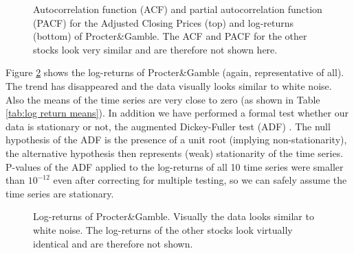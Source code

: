 \begin{figure}[h!]
    \centering
    \begin{adjustbox}{width=.95\textwidth,center}
    
    \end{adjustbox}  
    \hspace{3ex}
    \begin{adjustbox}{width=.95\textwidth,center}
    
    \end{adjustbox}
    \caption{Autocorrelation function (ACF) and partial autocorrelation function (PACF) for the Adjusted Closing Prices (top) and log-returns (bottom) of Procter\&Gamble. The ACF and PACF for the other stocks look very similar and are therefore not shown here.}
    \label{fig:acf_pacf_log_adjclose_PG}
\end{figure}
Figure \ref{fig:PG_fd_log_adjclose} shows the log-returns of Procter\&Gamble (again, representative of all). The trend has disappeared and the data visually looks similar to white noise. Also the means of the time series are very close to zero (as shown in Table \ref{tab:log return means}). In addition we have performed a formal test whether our data is stationary or not, the augmented Dickey-Fuller test (ADF) \citep{said_testing_1984}. The null hypothesis of the ADF is the presence of a unit root (implying non-stationarity), the alternative hypothesis then represents (weak) stationarity of the time series. P-values of the ADF applied to the log-returns of all 10 time series were smaller than $10^{-12}$ even after correcting for multiple testing, so we can safely assume the time series are stationary. 

\begin{figure}[h!]
    \centering
    \begin{adjustbox}{width=.9\textwidth,center}
    
    \end{adjustbox}  
    \caption{Log-returns of Procter\&Gamble. Visually the data looks similar to white noise. The log-returns of the other stocks look virtually identical and are therefore not shown.}
    \label{fig:PG_fd_log_adjclose}
\end{figure}{}

\begin{table}[h!]
    \centering
    \begin{adjustbox}{width = 0.95\linewidth}
    
    \end{adjustbox}
    \caption{}
    \label{tab:log return means}
\end{table}

